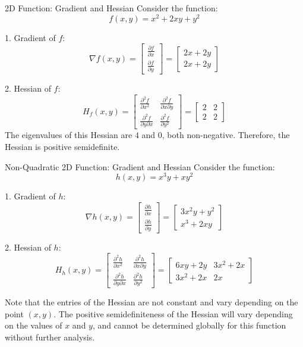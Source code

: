 \begin{example}{2D Function: Gradient and Hessian}{}
Consider the function:
\[ f(x, y) = x^2 + 2xy + y^2 \]

1. Gradient of \( f \):
\[
\nabla f(x, y) = \begin{bmatrix}
\frac{\partial f}{\partial x} \\
\frac{\partial f}{\partial y}
\end{bmatrix}
= \begin{bmatrix}
2x + 2y \\
2x + 2y
\end{bmatrix}
\]

2. Hessian of \( f \):
\[
H_f(x, y) = \begin{bmatrix}
\frac{\partial^2 f}{\partial x^2} & \frac{\partial^2 f}{\partial x \partial y} \\
\frac{\partial^2 f}{\partial y \partial x} & \frac{\partial^2 f}{\partial y^2}
\end{bmatrix}
= \begin{bmatrix}
2 & 2 \\
2 & 2
\end{bmatrix}
\]
The eigenvalues of this Hessian are \( 4 \) and \( 0 \), both non-negative. Therefore, the Hessian is positive semidefinite.
\end{example}


\begin{example}{Non-Quadratic 2D Function: Gradient and Hessian}{}
Consider the function:
\[ h(x, y) = x^3y + xy^2 \]

1. Gradient of \( h \):
\[
\nabla h(x, y) = \begin{bmatrix}
\frac{\partial h}{\partial x} \\
\frac{\partial h}{\partial y}
\end{bmatrix}
= \begin{bmatrix}
3x^2y + y^2 \\
x^3 + 2xy
\end{bmatrix}
\]

2. Hessian of \( h \):
\[
H_h(x, y) = \begin{bmatrix}
\frac{\partial^2 h}{\partial x^2} & \frac{\partial^2 h}{\partial x \partial y} \\
\frac{\partial^2 h}{\partial y \partial x} & \frac{\partial^2 h}{\partial y^2}
\end{bmatrix}
= \begin{bmatrix}
6xy + 2y & 3x^2 + 2x \\
3x^2 + 2x & 2x
\end{bmatrix}
\]

Note that the entries of the Hessian are not constant and vary depending on the point \((x, y)\). The positive semidefiniteness of the Hessian will vary depending on the values of \(x\) and \(y\), and cannot be determined globally for this function without further analysis.
\end{example}



